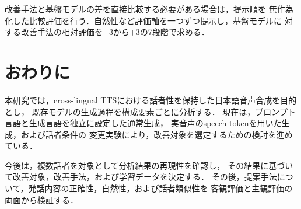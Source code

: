 \documentclass[twocolumn, a4paper]{UECIEresume}
\begin{document}
改善手法と基盤モデルの差を直接比較する必要がある場合は，提示順を
無作為化した比較評価を行う．自然性など評価軸を一つずつ提示し，基盤モデルに
対する改善手法の相対評価を$-3$から$+3$の7段階で求める．

\section{おわりに}

本研究では，cross-lingual TTSにおける話者性を保持した日本語音声合成を目的とし，
既存モデルの生成過程を構成要素ごとに分析する．
現在は，プロンプト言語と生成言語を独立に設定した通常生成，
実音声のspeech tokenを用いた生成，および話者条件の
変更実験により，改善対象を選定するための検討を進めている．

今後は，複数話者を対象として分析結果の再現性を確認し，
その結果に基づいて改善対象，改善手法，および学習データを決定する．
その後，提案手法について，発話内容の正確性，自然性，および話者類似性を
客観評価と主観評価の両面から検証する．

{\small


}
\end{document}
